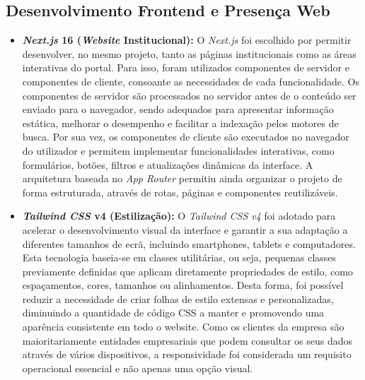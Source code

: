 \subsection{Desenvolvimento Frontend e Presença Web}
\begin{itemize}
    \item \textbf{\textit{Next.js} 16 (\textit{Website} Institucional):} O \textit{Next.js} foi escolhido por permitir desenvolver, no mesmo projeto, tanto as páginas institucionais como as áreas interativas do portal. Para isso, foram utilizados componentes de servidor e componentes de cliente, consoante as necessidades de cada funcionalidade. Os componentes de servidor são processados no servidor antes de o conteúdo ser enviado para o navegador, sendo adequados para apresentar informação estática, melhorar o desempenho e facilitar a indexação pelos motores de busca. Por sua vez, os componentes de cliente são executados no navegador do utilizador e permitem implementar funcionalidades interativas, como formulários, botões, filtros e atualizações dinâmicas da interface. A arquitetura baseada no \textit{App Router} permitiu ainda organizar o projeto de forma estruturada, através de rotas, páginas e componentes reutilizáveis.
    \item \textbf{\textit{Tailwind \ac{CSS}} v4 (Estilização):} O \textit{Tailwind CSS v4} foi adotado para acelerar o desenvolvimento visual da interface e garantir a sua adaptação a diferentes tamanhos de ecrã, incluindo smartphones, tablets e computadores. Esta tecnologia baseia-se em classes utilitárias, ou seja, pequenas classes previamente definidas que aplicam diretamente propriedades de estilo, como espaçamentos, cores, tamanhos ou alinhamentos. Desta forma, foi possível reduzir a necessidade de criar folhas de estilo extensas e personalizadas, diminuindo a quantidade de código CSS a manter e promovendo uma aparência consistente em todo o website. Como os clientes da empresa são maioritariamente entidades empresariais que podem consultar os seus dados através de vários dispositivos, a responsividade foi considerada um requisito operacional essencial e não apenas uma opção visual.
\end{itemize}

